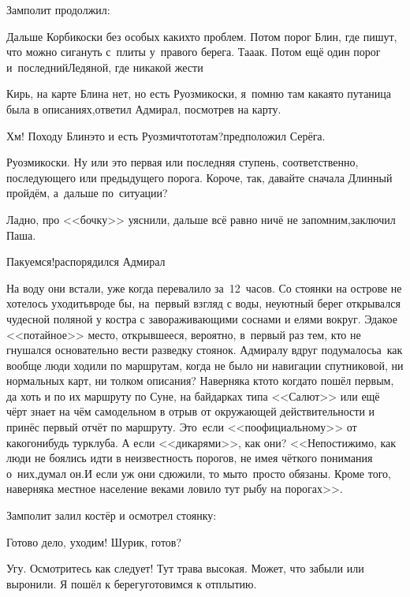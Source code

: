 Замполит продолжил:

\diagdash Дальше Корбикоски без особых каких\sdash то проблем. Потом порог Блин, где пишут, что можно сигануть с~плиты у~правого берега. Та\sdash а\sdash ак. Потом ещё один порог и~последний\mdash Ледяной, где никакой жести\myldots{}

\diagdash Кирь, на карте Блина нет, но есть Руозмикоски, я~помню там какая\sdash то путаница была в описаниях,\mdash ответил Адмирал, посмотрев на карту.

\diagdash Хм! Походу Блин\mdash это и есть Руозми\sdash что\sdash то\sdash там?\mdash предположил Серёга.

\diagdash Руозмикоски. Ну или это первая или последняя ступень, соответственно, последующего или предыдущего порога. Короче, так, давайте сначала Длинный пройдём, а~дальше по~ситуации?

\diagdash Ладно, про <<бочку>> уяснили, дальше всё равно ничё не запомним,\mdash заключил Паша.

\diagdash Пакуемся!\mdash распорядился Адмирал\myldots{}

\vspace{0.5cm}
\myldots{}На воду они встали, уже когда перевалило за~12~часов. Со стоянки на острове не хотелось уходить\mdash вроде бы, на~первый взгляд с воды, неуютный берег открывался чудесной поляной у костра с завораживающими соснами и елями вокруг. Эдакое <<потайное>> место, открывшееся, вероятно, в~первый раз тем, кто не гнушался основательно вести разведку стоянок. Адмиралу вдруг подумалось\mdash а~как вообще люди ходили по маршрутам, когда не было ни навигации спутниковой, ни нормальных карт, ни толком описания? Наверняка кто\sdash то когда\sdash то пошёл первым, да хоть и по их маршруту по Суне, на байдарках типа <<Салют>> или ещё чёрт знает на чём самодельном в отрыв от окружающей действительности и принёс первый отчёт по маршруту. Это~если <<по\sdash официальному>> от какого\sdash нибудь турклуба. А если <<дикарями>>, как они? <<Непостижимо, как люди не боялись идти в неизвестность порогов, не имея чёткого понимания о~них,\mdash думал он.\mdash И если уж они сдюжили, то мы\sdash то~просто обязаны. Кроме того, наверняка местное население веками ловило тут рыбу на порогах>>.

Замполит залил костёр и осмотрел стоянку:

\diagdash Готово дело, уходим! Шурик, готов?

\diagdash Угу. Осмотритесь как следует! Тут трава высокая. Может, что забыли или выронили. Я пошёл к берегу\mdash готовимся к отплытию. %

